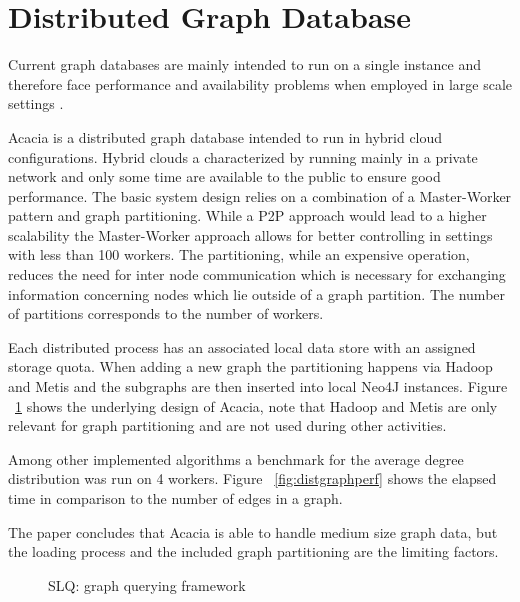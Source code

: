 \documentclass{sig-alternate}
\begin{document}
\section{Distributed Graph Database}
Current graph databases are mainly intended to run on a single instance and therefore
face performance and availability problems when employed in large scale settings \cite{dayarathna2012xgdbench} 
\cite{dayarathna2013graph}.

Acacia \cite{dayarathna2014towards} is a distributed graph database intended to run in hybrid cloud configurations.
Hybrid clouds a characterized by running mainly in a private network and only
some time are available to the public to ensure good performance.
The basic system design relies on a combination of a Master-Worker pattern 
and graph partitioning. While a P2P approach would lead to a higher scalability
the Master-Worker approach allows for better controlling in settings with less than 100 workers.
The partitioning, while an expensive operation, reduces the need for inter node communication
which is necessary for exchanging information concerning nodes which lie outside of a graph partition.
The number of partitions corresponds to the number of workers.

Each distributed process has an associated local data store with an assigned storage quota.
When adding a new graph the partitioning happens via Hadoop and Metis and the subgraphs are then inserted into local
Neo4J instances. Figure ~\ref{fig:distgraph} shows the underlying design of Acacia, note that Hadoop and Metis 
are only relevant for graph partitioning and are not used during other 
activities.

Among other implemented algorithms a benchmark for the average degree distribution was run on 4 workers.
Figure ~\ref{fig:distgraphperf} shows the elapsed time in comparison to the number of edges in a graph.

The paper concludes that Acacia is able to handle medium size graph data, but the loading process and 
the included graph partitioning are the limiting factors.

\begin{figure}
\centering
{}
\caption{SLQ: graph querying framework}
\label{fig:distgraph}
\end{figure}
\end{document}
